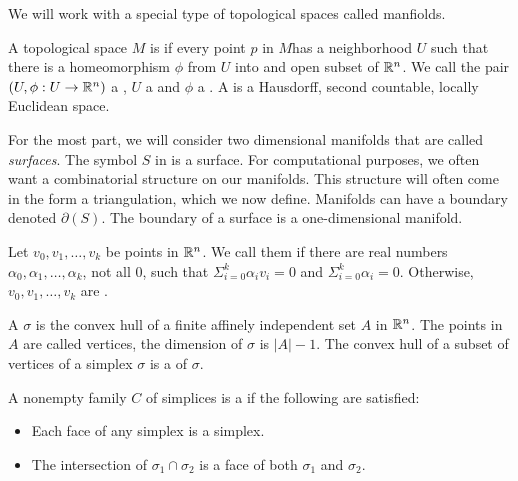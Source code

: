 We will work with a special type of topological spaces called manfiolds.

\begin{definition}
	A topological space $M$ is 
	if every point $p$ in $M$has a neighborhood $U$ such that there is  a
	homeomorphism  $\phi$ from $U$ into and open  subset of $\mathbb{R}^n$.
	We call the pair $(U,\phi: U\to \mathbb{R}^n)$ a , $U$ a 
	and  $\phi$ a . 
A  is a Hausdorff, second countable, locally Euclidean space.
\end{definition}

For the most part, we will consider two dimensional manifolds that are called \emph{surfaces}.
The symbol $S$ in  is a surface.
For computational purposes, we often want a combinatorial structure on our manifolds.
This structure will often come in the form a triangulation, which we now define.
Manifolds can have a boundary denoted $\partial(S)$.
The boundary of a surface is a one-dimensional manifold.


\begin{definition}
Let $v_0,v_1,\ldots,v_k$ be points in $\mathbb{R}^n$. We call them 
if there are real numbers $\alpha_0,\alpha_1,\ldots,\alpha_k$, not all 0, such that
$\Sigma_{i=0}^k \alpha_iv_i=0$ and $\Sigma_{i=0}^k \alpha_i=0.$
Otherwise,  $v_0,v_1,\ldots,v_k$ are .

\end{definition}

\begin{definition}[Simplices]
A  $\sigma$ is the convex hull of a finite affinely independent
set $A$ in $\mathbb{R}^n$. The points in  $A$ are  called vertices, the dimension
of  $\sigma$ is $|A|-1$.  The convex hull of a subset of vertices of a simplex
$\sigma$ is a  of $\sigma$.
\end{definition}

\begin{definition}
A nonempty family $C$ of simplices is a  if the following
are satisfied:
\begin{itemize}
\item  Each face of any simplex is a simplex.
\item The intersection of $\sigma_1 \cap \sigma_2$ is a face of both $\sigma_1$ and 
$\sigma_2$.
\end{itemize}


\end{definition}

